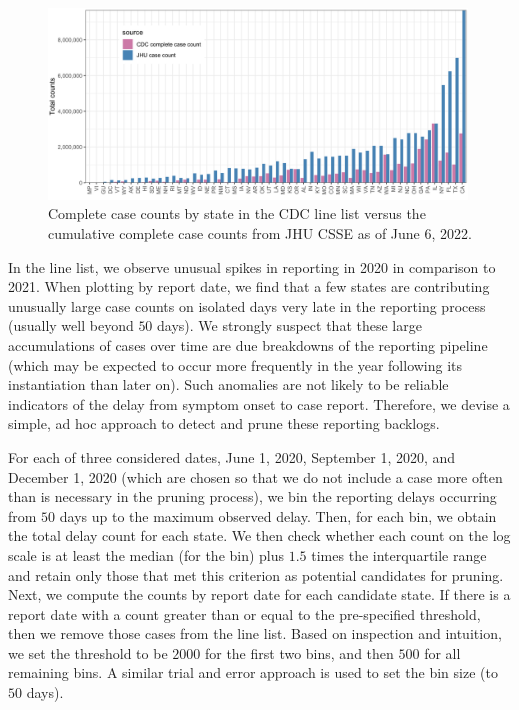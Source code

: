 \documentclass{article}
\begin{document}
\begin{figure}[!tb]
\centering
    \includegraphics[width=0.99\textwidth]{prop_cc_cdc_vs_jhu.pdf} 
    \caption{Complete case counts by state in the CDC line list versus the 
    cumulative complete case counts from JHU CSSE as of June 6, 2022.}
    \label{fig:prop_cc_cdc_vs_jhu}
\end{figure}

In the line list, we observe unusual spikes in reporting in 2020 in comparison
to 2021. When plotting by report date, we find that a few states are
contributing unusually large case counts on isolated days very late in the
reporting process (usually well beyond $50$ days). We strongly suspect that
these large accumulations of cases over time are due breakdowns of the reporting
pipeline (which may be expected to occur more frequently in the year following
its instantiation than later on). Such anomalies are not likely to be reliable
indicators of the delay from symptom onset to case report. Therefore, we devise
a simple, ad hoc approach to detect and prune these reporting backlogs. 

For each of three considered dates, June 1, 2020, September 1, 2020, and
December 1, 2020 (which are chosen so that we do not include a case more often
than is necessary in the pruning process), we bin the reporting delays occurring
from $50$ days up to the maximum observed delay. Then, for each bin, we obtain
the total delay count for each state. We then check whether each count on the
log scale is at least the median (for the bin) plus $1.5$ times the
interquartile range and retain only those that met this criterion as potential
candidates for pruning. Next, we compute the counts by report date for each
candidate state. If there is a report date with a count greater than or equal to
the pre-specified threshold, then we remove those cases from the line list.
Based on inspection and intuition, we set the threshold to be $2000$ for the
first two bins, and then $500$ for all remaining bins. A similar trial and error
approach is used to set the bin size (to $50$ days). %
\end{document}
